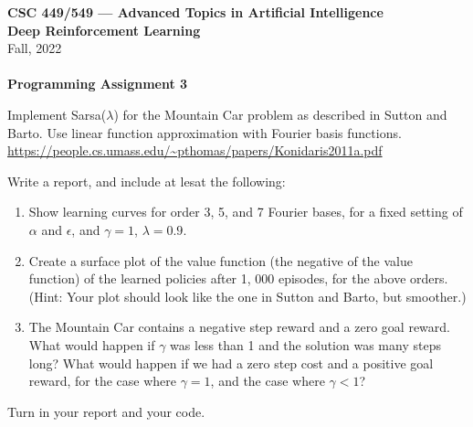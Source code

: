 \documentclass[12pt]{article}
\begin{document}
\begin{center}
  {
  \bf\large
  CSC  449/549 --- Advanced Topics in Artificial Intelligence\\
  Deep Reinforcement Learning
  }\\
  Fall, 2022\\
\ \\
    {\bf
      Programming Assignment 3
    }
  
\end{center}
Implement Sarsa($\lambda$) for the Mountain Car problem as described in Sutton and Barto. Use linear function approximation with Fourier basis functions. \url{https://people.cs.umass.edu/~pthomas/papers/Konidaris2011a.pdf}

Write a report, and include at lesat the following:
\begin{enumerate}
\item Show learning curves for order 3, 5, and 7 Fourier bases, for a fixed setting of $\alpha$ and $\epsilon$, and $\gamma = 1$, $\lambda = 0.9$.

\item Create a surface plot of the value function (the negative of the value function) of the learned policies after 1, 000 episodes,
for the above orders. (Hint: Your plot should look like the one in Sutton and Barto, but smoother.)

\item The Mountain Car contains a negative step reward and a zero goal reward. What would happen if $\gamma$ was less than
1 and the solution was many steps long? What would happen if we had a zero step cost and a positive goal reward,
for the case where $\gamma = 1$, and the case where $\gamma < 1$?
\end{enumerate}

Turn in your report and your code.
\end{document}
